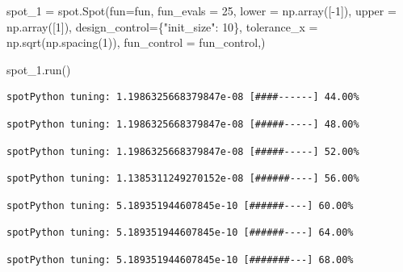 \documentclass[
  letterpaper,
  DIV=11,
  numbers=noendperiod]{scrreprt}
\newenvironment{Shaded}{\begin{snugshade}}{\end{snugshade}}
\newcommand{\DecValTok}[1]{\textcolor[rgb]{0.68,0.00,0.00}{#1}}
\newcommand{\NormalTok}[1]{\textcolor[rgb]{0.00,0.23,0.31}{#1}}
\newcommand{\OperatorTok}[1]{\textcolor[rgb]{0.37,0.37,0.37}{#1}}
\newcommand{\StringTok}[1]{\textcolor[rgb]{0.13,0.47,0.30}{#1}}
\begin{document}
\begin{Shaded}
\begin{Highlighting}[]
\NormalTok{spot\_1 }\OperatorTok{=}\NormalTok{ spot.Spot(fun}\OperatorTok{=}\NormalTok{fun,}
\NormalTok{                   fun\_evals }\OperatorTok{=} \DecValTok{25}\NormalTok{,}
\NormalTok{                   lower }\OperatorTok{=}\NormalTok{ np.array([}\OperatorTok{{-}}\DecValTok{1}\NormalTok{]),}
\NormalTok{                   upper }\OperatorTok{=}\NormalTok{ np.array([}\DecValTok{1}\NormalTok{]),}
\NormalTok{                   design\_control}\OperatorTok{=}\NormalTok{\{}\StringTok{"init\_size"}\NormalTok{: }\DecValTok{10}\NormalTok{\},}
\NormalTok{                   tolerance\_x }\OperatorTok{=}\NormalTok{ np.sqrt(np.spacing(}\DecValTok{1}\NormalTok{)),}
\NormalTok{                   fun\_control }\OperatorTok{=}\NormalTok{ fun\_control,)}

\NormalTok{spot\_1.run()}
\end{Highlighting}
\end{Shaded}

\begin{verbatim}
spotPython tuning: 1.1986325668379847e-08 [####------] 44.00% 
\end{verbatim}

\begin{verbatim}
spotPython tuning: 1.1986325668379847e-08 [#####-----] 48.00% 
\end{verbatim}

\begin{verbatim}
spotPython tuning: 1.1986325668379847e-08 [#####-----] 52.00% 
\end{verbatim}

\begin{verbatim}
spotPython tuning: 1.1385311249270152e-08 [######----] 56.00% 
\end{verbatim}

\begin{verbatim}
spotPython tuning: 5.189351944607845e-10 [######----] 60.00% 
\end{verbatim}

\begin{verbatim}
spotPython tuning: 5.189351944607845e-10 [######----] 64.00% 
\end{verbatim}

\begin{verbatim}
spotPython tuning: 5.189351944607845e-10 [#######---] 68.00% 
\end{verbatim}
\end{document}
